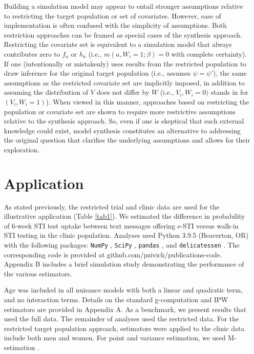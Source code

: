 \documentclass[]{article}
\begin{document}
Building a simulation model may appear to entail stronger assumptions relative to restricting the target population or set of covariates. However, ease of implementation is often confused with the simplicity of assumptions. Both restriction approaches can be framed as special cases of the synthesis approach. Restricting the covariate set is equivalent to a simulation model that always contributes zero to $f_a$ or $h_a$ (i.e., $m(a,W_i=1;\beta) = 0$ with complete certainty). If one (intentionally or mistakenly) uses results from the restricted population to draw inference for the original target population (i.e., assumes $\psi=\psi'$), the same assumptions as the restricted covariate set are implicitly imposed, in addition to assuming the distribution of $V$ does not differ by $W$ (i.e., $V_i,W_i=0)$ stands in for $(V_i,W_i=1)$). When viewed in this manner, approaches based on restricting the population or covariate set are shown to require more restrictive assumptions relative to the synthesis approach. So, even if one is skeptical that such external knowledge could exist, model synthesis constitutes an alternative to addressing the original question that clarifies the underlying assumptions and allows for their exploration.

\section*{Application}

As stated previously, the restricted trial and clinic data are used for the illustrative application (Table \ref{tab1}). We estimated the difference in probability of 6-week STI test uptake between text messages offering e-STI versus walk-in STI testing in the clinic population. Analyses used Python 3.9.5 (Beaverton, OR) with the following packages: \texttt{NumPy} \cite{harris_array_2020}, \texttt{SciPy} \cite{virtanen_scipy_2020}, \texttt{pandas} \cite{mckinney_data_2010}, and \texttt{delicatessen} \cite{zivich_delicatessen_2022}. The corresponding code is provided at github.com/pzivich/publications-code. Appendix B includes a brief simulation study demonstrating the performance of the various estimators.

Age was included in all nuisance models with both a linear and quadratic term, and no interaction terms. Details on the standard g-computation and IPW estimators are provided in Appendix A. As a benchmark, we present results that used the full data. The remainder of analyses used the restricted data. For the restricted target population approach, estimators were applied to the clinic data include both men and women. For point and variance estimation, we used M-estimation \cite{zivich_delicatessen_2022, stefanski_calculus_2002}.
\end{document}
